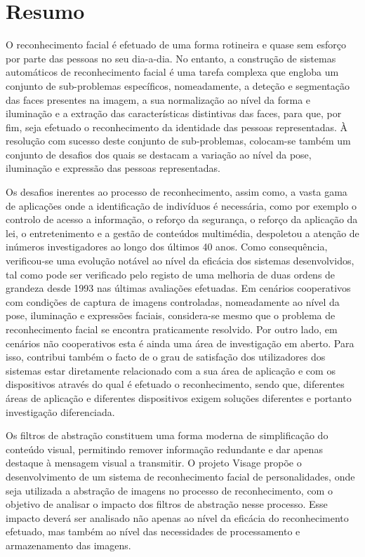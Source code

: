 \chapter*{Resumo}
O reconhecimento facial é efetuado de uma forma rotineira e quase sem esforço por parte das pessoas no seu dia-a-dia. No entanto, a construção de sistemas automáticos de reconhecimento facial é uma tarefa complexa que engloba um conjunto de sub-problemas específicos, nomeadamente, a deteção e segmentação das faces presentes na imagem, a sua normalização ao nível da forma e iluminação e a extração das características distintivas das faces, para que, por fim, seja efetuado o reconhecimento da identidade das pessoas representadas. À resolução com sucesso deste conjunto de sub-problemas, colocam-se também um conjunto de desafios dos quais se destacam a variação ao nível da pose, iluminação e expressão das pessoas representadas.

Os desafios inerentes ao processo de reconhecimento, assim como, a vasta gama de aplicações onde a identificação de indivíduos é necessária, como por exemplo o controlo de acesso a informação, o reforço da segurança, o reforço da aplicação da lei, o entretenimento e a gestão de conteúdos multimédia, despoletou a atenção de inúmeros investigadores ao longo dos últimos 40 anos. Como consequência, verificou-se uma evolução notável ao nível da eficácia dos sistemas desenvolvidos, tal como pode ser verificado pelo registo de uma melhoria de duas ordens de grandeza desde 1993 nas últimas avaliações efetuadas. Em cenários cooperativos com condições de captura de imagens controladas, nomeadamente ao nível da pose, iluminação e expressões faciais, considera-se mesmo que o problema de reconhecimento facial se encontra praticamente resolvido. Por outro lado, em cenários não cooperativos esta é ainda uma área de investigação em aberto. Para isso, contribui também o facto de o grau de satisfação dos utilizadores dos sistemas estar diretamente relacionado com a sua área de aplicação e com os dispositivos através do qual é efetuado o reconhecimento, sendo que, diferentes áreas de aplicação e diferentes dispositivos exigem soluções diferentes e portanto investigação diferenciada.

Os filtros de abstração constituem uma forma moderna de simplificação do conteúdo visual, permitindo remover informação redundante e dar apenas destaque à mensagem visual a transmitir. O projeto Visage propõe o desenvolvimento de um sistema de reconhecimento facial de personalidades, onde seja utilizada a abstração de imagens no processo de reconhecimento, com o objetivo de analisar o impacto dos filtros de abstração nesse processo. Esse impacto deverá ser analisado não apenas ao nível da eficácia do reconhecimento efetuado, mas também ao nível das necessidades de processamento e armazenamento das imagens.

